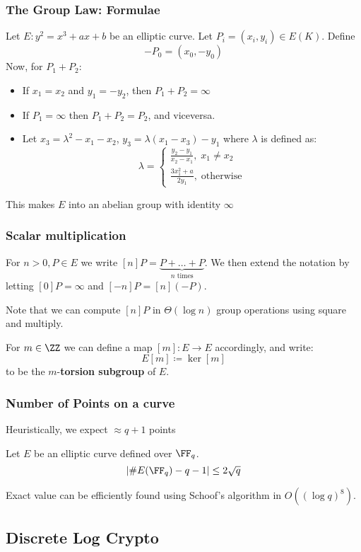 \documentclass{beamer}
\begin{document}
\begin{frame}
    \frametitle{The Group Law: Formulae}
    Let $E: y^2 = x^3 + a x + b$ be an elliptic curve. Let $P_i = (x_i, y_i) \in E(K)$. Define 
    \[ -P_0 = (x_0, -y_0 )\]
    Now, for $P_1 + P_2$: 
    \begin{itemize}
        \item If $x_1 = x_2$ and $y_1 = -y_2$, then $P_1 + P_2 = \infty$
        \item If $P_1 = \infty$ then $P_1 + P_2 = P_2$, and viceversa.
        \item Let $x_3 = \lambda^2 - x_1 - x_2$, $y_3 = \lambda(x_1 - x_3) - y_1$ where $\lambda$ is defined as:
        \[ \lambda = \begin{cases}
            \frac{y_2 - y_1}{x_2 - x_1}, \; x_1 \neq x_2 \\
            \frac{3 x_1^2 + a}{2y_1},\; \text{otherwise}
        \end{cases} \]
    \end{itemize}
    This makes $E$ into an abelian group with identity $\infty$ 
\end{frame}

\begin{frame}
    \frametitle{Scalar multiplication}
    For $n > 0, P \in E$ we write $[n]P = \underbrace{P + \dots + P}_{n \text{ times}}$. We then extend the notation by letting $[0]P = \infty$ and 
    $[-n]P = [n](-P)$.

    Note that we can compute $[n]P$ in $\Theta(\log n)$ group operations using square and multiply.

    For $m \in \ZZ$ we can define a map $[m]: E \to E$ accordingly, and write:
    \[ E[m] \coloneqq \ker[m] \]
    to be the $m$-\textbf{torsion subgroup} of $E$.
\end{frame}

\begin{frame}
    \frametitle{Number of Points on a curve}
    Heuristically, we expect $\approx q + 1$ points
    \begin{theorem}[Hasse]
        Let $E$ be an elliptic curve defined over $\FF_q$.
        \[ \left|\#E(\FF_q) - q - 1\right| \leq 2 \sqrt{q} \] 
    \end{theorem}
    Exact value can be efficiently found using Schoof's algorithm in $O((\log q)^8)$.
\end{frame}

\subsection{Discrete Log Crypto}
\end{document}
